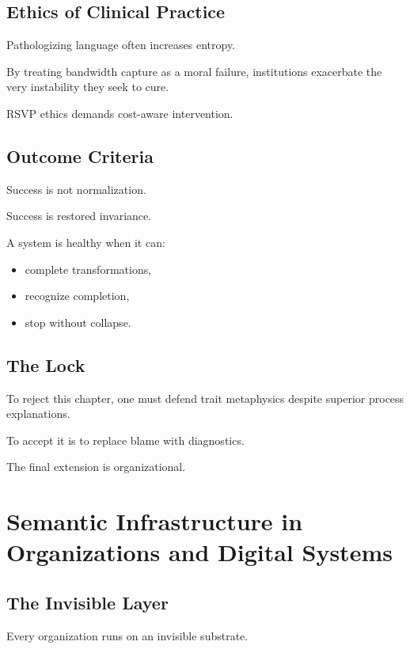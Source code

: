 \documentclass[11pt]{book}
\begin{document}
\section{Ethics of Clinical Practice}

Pathologizing language often increases entropy.

By treating bandwidth capture as a moral failure, institutions exacerbate the
very instability they seek to cure.

RSVP ethics demands cost-aware intervention.

\section{Outcome Criteria}

Success is not normalization.

Success is restored invariance.

A system is healthy when it can:
\begin{itemize}
\item complete transformations,
\item recognize completion,
\item stop without collapse.
\end{itemize}

\section{The Lock}

To reject this chapter, one must defend trait metaphysics despite superior
process explanations.

To accept it is to replace blame with diagnostics.

The final extension is organizational.


\chapter{Semantic Infrastructure in Organizations and Digital Systems}

\section{The Invisible Layer}

Every organization runs on an invisible substrate.
\end{document}
